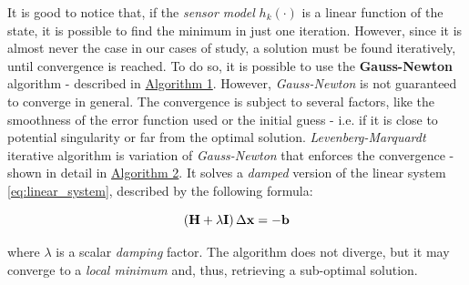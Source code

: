 It is good to notice that, if the \textit{sensor model} $h_k(\cdot)$ is a linear function of the state, it is possible to find the minimum in just one iteration. However, since it is almost never the case in our cases of study, a solution must be found iteratively, until convergence is reached. To do so, it is possible to use the \textbf{Gauss-Newton} algorithm - described in \hyperref[alg:gn_standard]{Algorithm 1}. However, \textit{Gauss-Newton} is not guaranteed to converge in general. The convergence is subject to several factors, like the smoothness of the error function used or the initial guess - i.e. if it is close to potential singularity or far from the optimal solution. \textit{Levenberg-Marquardt} iterative algorithm is variation of \textit{Gauss-Newton} that enforces the convergence - shown in detail in \hyperref[alg:lm_standard]{Algorithm 2}. It solves a \textit{damped} version of the linear system \ref{eq:linear_system}, described by the following formula:

\begin{equation}
    \left(\mathbf{H} + \lambda\mathbf{I}\right)\Delta \mathbf{x} = -\mathbf{b}
    \label{eq:lm_algorithm}
\end{equation} 

\noindent where $\lambda$ is a scalar \textit{damping} factor. The algorithm does not diverge, but it may converge to a \textit{local minimum} and, thus, retrieving a sub-optimal solution. 


